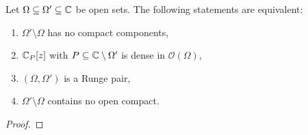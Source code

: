 \begin{izrek}
    Let $\Omega \subseteq \Omega' \subseteq \mathbb{C}$ be open sets. The following statements are equivalent:
    \begin{enumerate}
        \item $\Omega' \setminus \Omega$ has no compact components,
        \item $\mathbb{C}_P[z]$ with $P \subseteq \mathbb{C} \setminus \Omega'$ is dense in $\mathcal{O}(\Omega)$,
        \item $(\Omega, \Omega')$ is a Runge pair,
        \item $\Omega' \setminus \Omega$ contains no open compact.
    \end{enumerate}
\end{izrek}
\begin{proof}
    
\end{proof}